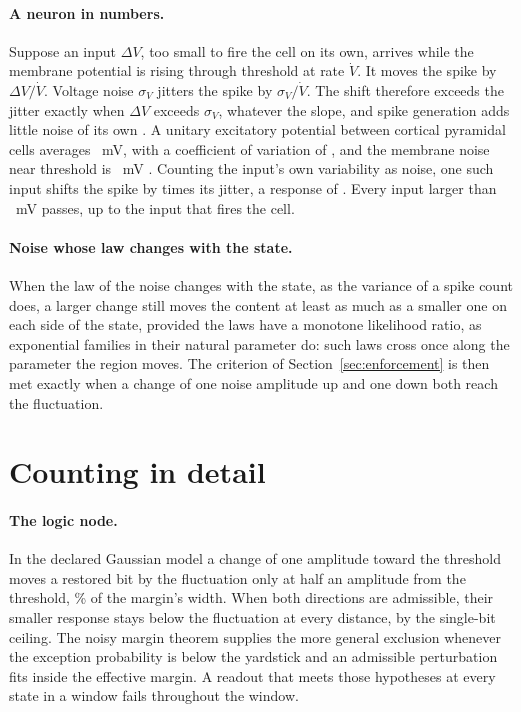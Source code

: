 \documentclass[12pt]{article}
\begin{document}
\paragraph{A neuron in numbers.} Suppose an
input $\Delta V$, too small to fire the cell on its own, arrives while the
membrane potential is rising through threshold at rate $\dot V$. It moves the
spike by $\Delta V/\dot V$. Voltage noise $\sigma_V$ jitters the spike by
$\sigma_V/\dot V$. The shift therefore exceeds the jitter exactly when
$\Delta V$ exceeds $\sigma_V$, whatever the slope, and spike generation adds
little noise of its own \citep{mainen1995}. A unitary excitatory potential
between cortical pyramidal cells averages \ueEpspMv{}~mV, with a coefficient of
variation of \ueEpspCv{} \citep{markram1997}, and the membrane noise near
threshold is \ueMembraneNoiseMv{}~mV \citep{jacobson2005}. Counting the input's
own variability as noise, one such input shifts the spike by
\ueCorticalShiftToJitter{} times its jitter, a response of \ueCorticalTV{}.
Every input larger than \ueEpspPassMv{}~mV passes, up to the input that fires
the cell.

\paragraph{Noise whose law changes with the state.} When the law of the noise
changes with the state, as the variance of a spike count does, a larger change
still moves the content at least as much as a smaller one on each side of the
state, provided the laws have a monotone likelihood ratio, as exponential
families in their natural parameter do: such laws cross once along the parameter the region moves. The
criterion of Section~\ref{sec:enforcement} is then met exactly when a change of
one noise amplitude up and one down both reach the fluctuation.

\section{Counting in detail}
\label{app:count}

\paragraph{The logic node.} In the declared Gaussian model a change of one
amplitude toward the threshold moves a restored bit by the fluctuation only
at half an amplitude from the threshold, \ueGradedWindowPercent\% of the margin's width.
When both directions are admissible, their smaller response stays below the
fluctuation at every distance, by the single-bit ceiling. The noisy margin
theorem supplies the more general exclusion whenever the exception probability
is below the yardstick and an admissible perturbation fits inside the effective
margin. A readout that meets those hypotheses at every state in a window fails
throughout the window.
\end{document}
